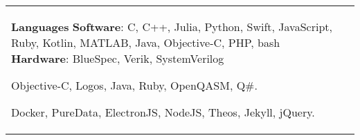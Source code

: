 \documentclass{resume}
\begin{document}
\begin{minipage}[t][0pt]{\linewidth}
\begin{center}
\begin{tabularx}{\linewidth}{ p{6cm} X  }
{{            \vspace{\skillSpacing}
        
            \textbf{Languages} \newline
            {\footnotesize \textbf{Software}: C, C++, Julia, Python, Swift, JavaScript, Ruby, Kotlin, MATLAB, 
Java, Objective-C, PHP, bash\newline
            \textbf{Hardware}: BlueSpec, Verik, SystemVerilog
            }{}{}
            
            
Objective-C, Logos, Java, Ruby, OpenQASM, Q\#.}{}{}
Docker, PureData, ElectronJS, NodeJS, Theos, Jekyll,  jQuery.}{}{} %
    }

    \vspace{-200px}
    
} 
& 
{

    \def \rightColVertSpacing {2px}

}
\end{tabularx}
\end{center}
\end{minipage}
\end{document}
